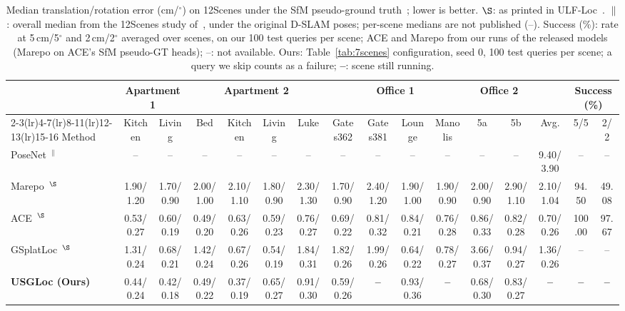 \documentclass[journal]{IEEEtran}
\newcommand{\res}{{\color{red}\textbf{--}}}
\newcommand{\method}{USGLoc}
\begin{document}
\begin{table}[t]
\centering
\caption{Median translation/rotation error (cm/$^\circ$) on 12Scenes under the SfM pseudo-ground truth~\cite{brachmann2021dslam}; lower is better. $\S$: as printed in ULF-Loc~\cite{ulfloc}. $\|$: overall median from the 12Scenes study of~\cite{marepo}, under the original D-SLAM poses; per-scene medians are not published (--). Success (\%): rate at 5\,cm/5$^\circ$ and 2\,cm/2$^\circ$ averaged over scenes, on our 100 test queries per scene; ACE and Marepo from our runs of the released models (Marepo on ACE's SfM pseudo-GT heads); --: not available. Ours: Table~\ref{tab:7scenes} configuration, seed 0, 100 test queries per scene; a query we skip counts as a failure; \res: scene still running.}
\label{tab:12scenes}
\setlength{\tabcolsep}{1.6pt}
\scriptsize
\begin{tabular}{lccccccccccccccc}
\toprule
& \multicolumn{2}{c}{Apartment 1} & \multicolumn{4}{c}{Apartment 2} & \multicolumn{4}{c}{Office 1} & \multicolumn{2}{c}{Office 2} & & \multicolumn{2}{c}{Success (\%)}\\
\cmidrule(lr){2-3}\cmidrule(lr){4-7}\cmidrule(lr){8-11}\cmidrule(lr){12-13}\cmidrule(lr){15-16}
Method & Kitchen & Living & Bed & Kitchen & Living & Luke & Gates362 & Gates381 & Lounge & Manolis & 5a & 5b & Avg. & 5/5 & 2/2\\
\midrule
PoseNet~\cite{posenet}$^{\|}$ & -- & -- & -- & -- & -- & -- & -- & -- & -- & -- & -- & -- & 9.40/3.90 & -- & --\\
Marepo~\cite{marepo}$^\S$ & 1.90/1.20 & 1.70/0.90 & 2.00/1.00 & 2.10/1.10 & 1.80/0.90 & 2.30/1.30 & 1.70/0.90 & 2.40/1.20 & 1.90/1.00 & 1.90/0.90 & 2.00/0.90 & 2.90/1.10 & 2.10/1.04 & 94.50 & 49.08\\
ACE~\cite{ace}$^\S$ & 0.53/0.27 & 0.60/0.19 & 0.49/0.20 & 0.63/0.26 & 0.59/0.23 & 0.76/0.27 & 0.69/0.22 & 0.81/0.32 & 0.84/0.21 & 0.76/0.28 & 0.86/0.33 & 0.82/0.28 & 0.70/0.26 & 100.00 & 97.67\\
GSplatLoc~\cite{gsplatloc}$^\S$ & 1.31/0.24 & 0.68/0.21 & 1.42/0.24 & 0.67/0.26 & 0.54/0.19 & 1.84/0.31 & 1.82/0.26 & 1.99/0.26 & 0.64/0.22 & 0.78/0.27 & 3.66/0.37 & 0.94/0.27 & 1.36/0.26 & -- & --\\
\textbf{\method{} (Ours)} & 0.44/0.24 & 0.42/0.18 & 0.49/0.22 & 0.37/0.19 & 0.65/0.27 & 0.91/0.30 & 0.59/0.26 & \res & 0.93/0.36 & \res & 0.68/0.30 & 0.83/0.27 & \res & \res & \res\\
\bottomrule
\end{tabular}
\end{table}
\end{document}
